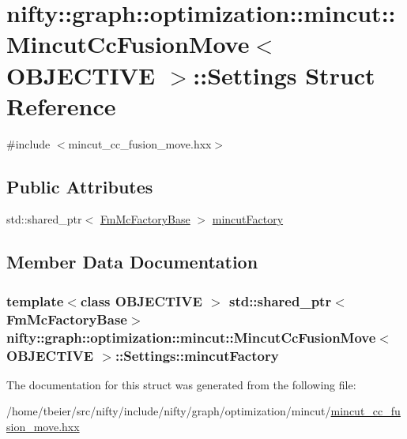\hypertarget{structnifty_1_1graph_1_1optimization_1_1mincut_1_1MincutCcFusionMove_1_1Settings}{}\section{nifty\+:\+:graph\+:\+:optimization\+:\+:mincut\+:\+:Mincut\+Cc\+Fusion\+Move$<$ O\+B\+J\+E\+C\+T\+I\+V\+E $>$\+:\+:Settings Struct Reference}
\label{structnifty_1_1graph_1_1optimization_1_1mincut_1_1MincutCcFusionMove_1_1Settings}


{\ttfamily \#include $<$mincut\+\_\+cc\+\_\+fusion\+\_\+move.\+hxx$>$}

\subsection*{Public Attributes}
\begin{DoxyCompactItemize}
\item 
std\+::shared\+\_\+ptr$<$ \hyperlink{classnifty_1_1graph_1_1optimization_1_1mincut_1_1MincutCcFusionMove_a148eb954d96998c83c9eab9e46d8ecb6}{Fm\+Mc\+Factory\+Base} $>$ \hyperlink{structnifty_1_1graph_1_1optimization_1_1mincut_1_1MincutCcFusionMove_1_1Settings_a0a77709b2d6ebe90de084b7116994329}{mincut\+Factory}
\end{DoxyCompactItemize}


\subsection{Member Data Documentation}
\hypertarget{structnifty_1_1graph_1_1optimization_1_1mincut_1_1MincutCcFusionMove_1_1Settings_a0a77709b2d6ebe90de084b7116994329}{}
\subsubsection[{mincut\+Factory}]{\setlength{\rightskip}{0pt plus 5cm}template$<$class O\+B\+J\+E\+C\+T\+I\+V\+E $>$ std\+::shared\+\_\+ptr$<${\bf Fm\+Mc\+Factory\+Base}$>$ {\bf nifty\+::graph\+::optimization\+::mincut\+::\+Mincut\+Cc\+Fusion\+Move}$<$ O\+B\+J\+E\+C\+T\+I\+V\+E $>$\+::Settings\+::mincut\+Factory}\label{structnifty_1_1graph_1_1optimization_1_1mincut_1_1MincutCcFusionMove_1_1Settings_a0a77709b2d6ebe90de084b7116994329}


The documentation for this struct was generated from the following file\+:\begin{DoxyCompactItemize}
\item 
/home/tbeier/src/nifty/include/nifty/graph/optimization/mincut/\hyperlink{mincut__cc__fusion__move_8hxx}{mincut\+\_\+cc\+\_\+fusion\+\_\+move.\+hxx}\end{DoxyCompactItemize}
